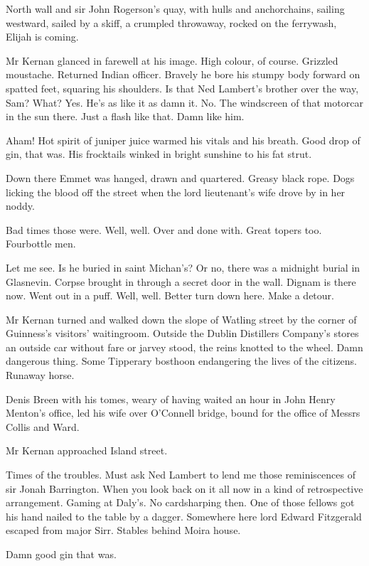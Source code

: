 North wall and sir John Rogerson's quay, with hulls and anchorchains,
sailing westward, sailed by a skiff, a crumpled throwaway, rocked on the
ferrywash, Elijah is coming.

Mr Kernan glanced in farewell at his image.
High colour, of course.
Grizzled moustache.
Returned Indian officer.
Bravely he bore his stumpy body forward on spatted feet, squaring his shoulders.
Is that Ned Lambert's brother over the way, Sam?
What?
Yes.
He's as like it as damn it.
No.
The windscreen of that motorcar in the sun there.
Just a flash like that.
Damn like him.%

Aham! Hot spirit of juniper juice warmed his vitals and his breath. Good
drop of gin, that was. His frocktails winked in bright sunshine to his
fat strut.

Down there Emmet was hanged, drawn and quartered. Greasy black rope. Dogs
licking the blood off the street when the lord lieutenant's wife drove by
in her noddy.

Bad times those were. Well, well. Over and done with. Great topers too.
Fourbottle men.

Let me see.
Is he buried in saint Michan's?
Or no, there was a midnight burial in Glasnevin.
Corpse brought in through a secret door in the wall.
Dignam is there now.
Went out in a puff.
Well, well.
Better turn down here.
Make a detour.

Mr Kernan turned and walked down the slope of Watling street by the
corner of Guinness's visitors' waitingroom. Outside the Dublin Distillers
Company's stores an outside car without fare or jarvey stood, the reins
knotted to the wheel. Damn dangerous thing. Some Tipperary bosthoon
endangering the lives of the citizens. Runaway horse.

Denis Breen with his tomes,
weary of having waited an hour in John Henry Menton's office,
led his wife over O'Connell bridge,
bound for the office
of Messrs Collis and Ward.

Mr Kernan approached Island street.

Times of the troubles. Must ask Ned Lambert to lend me those
reminiscences of sir Jonah Barrington. When you look back on it all now
in a kind of retrospective arrangement. Gaming at Daly's. No cardsharping
then. One of those fellows got his hand nailed to the table by a dagger.
Somewhere here lord Edward Fitzgerald escaped from major Sirr. Stables
behind Moira house.

Damn good gin that was.


